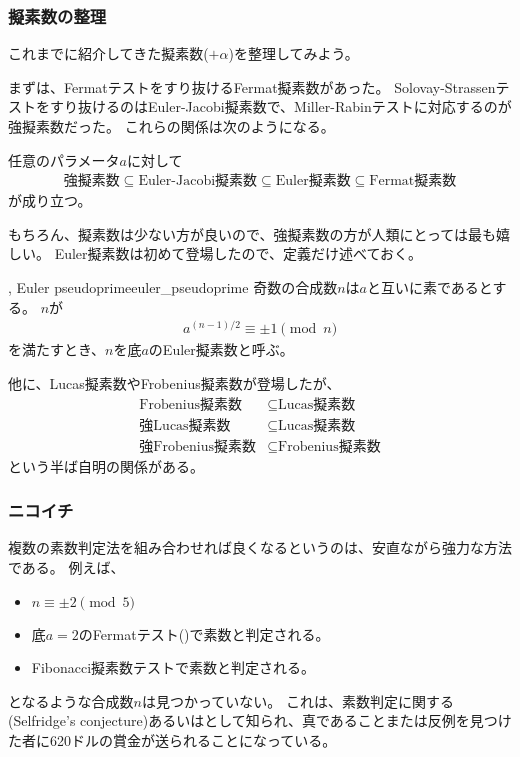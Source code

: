 \subsubsection{擬素数の整理}
これまでに紹介してきた擬素数($+\alpha$)を整理してみよう。

まずは、Fermatテストをすり抜けるFermat擬素数があった。
Solovay-Strassenテストをすり抜けるのはEuler-Jacobi擬素数で、Miller-Rabinテストに対応するのが強擬素数だった。
これらの関係は次のようになる。

\begin{Theo}{}{}
任意のパラメータ$a$に対して
\begin{align*}
\mbox{強擬素数} \subseteq \mbox{Euler-Jacobi擬素数} \subseteq \mbox{Euler擬素数} \subseteq \mbox{Fermat擬素数}
\end{align*}
が成り立つ。
\end{Theo}

もちろん、擬素数は少ない方が良いので、強擬素数の方が人類にとっては最も嬉しい。
Euler擬素数は初めて登場したので、定義だけ述べておく。

\begin{Defi}{, Euler pseudoprime}{euler_pseudoprime}
奇数の合成数$n$は$a$と互いに素であるとする。
$n$が
\begin{align*}
a^{(n-1)/2} \equiv \pm 1 \pmod{n}
\end{align*}
を満たすとき、$n$を底$a$のEuler擬素数と呼ぶ。
\end{Defi}

他に、Lucas擬素数やFrobenius擬素数が登場したが、
\begin{align*}
\mbox{Frobenius擬素数} &\subseteq \mbox{Lucas擬素数}\\
\mbox{強Lucas擬素数} &\subseteq \mbox{Lucas擬素数}\\
\mbox{強Frobenius擬素数} &\subseteq \mbox{Frobenius擬素数}
\end{align*}
という半ば自明の関係がある。

\subsubsection{ニコイチ}
複数の素数判定法を組み合わせれば良くなるというのは、安直ながら強力な方法である。
例えば、
\begin{itemize}
 \item $n \equiv \pm 2 \pmod{5}$
 \item 底$a=2$のFermatテスト()で素数と判定される。
 \item Fibonacci擬素数テストで素数と判定される。
\end{itemize}
となるような合成数$n$は見つかっていない。
これは、素数判定に関する(Selfridge's conjecture)あるいはとして知られ、真であることまたは反例を見つけた者に620ドルの賞金が送られることになっている\cite{A_Computational_Perspective}。

